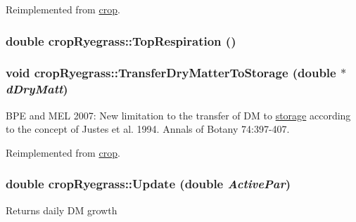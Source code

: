 Reimplemented from \hyperlink{classcrop_a8b5cf5b385f82405af121592f7106fc2}{crop}.\hypertarget{classcrop_ryegrass_a81ee410c4677a88854065d2cbcecf4fc}{
\subsubsection[{TopRespiration}]{\setlength{\rightskip}{0pt plus 5cm}double cropRyegrass::TopRespiration ()}}
\label{classcrop_ryegrass_a81ee410c4677a88854065d2cbcecf4fc}
\hypertarget{classcrop_ryegrass_a41ff7bdc52b0466a4598e104b4723572}{
\subsubsection[{TransferDryMatterToStorage}]{\setlength{\rightskip}{0pt plus 5cm}void cropRyegrass::TransferDryMatterToStorage (double $\ast$ {\em dDryMatt})}}
\label{classcrop_ryegrass_a41ff7bdc52b0466a4598e104b4723572}
BPE and MEL 2007: New limitation to the transfer of DM to \hyperlink{classstorage}{storage} according to the concept of Justes et al. 1994. Annals of Botany 74:397-\/407. 

Reimplemented from \hyperlink{classcrop_aa93103e69836afc4fb23c1a29b15584f}{crop}.\hypertarget{classcrop_ryegrass_a6785773151146d1e49ec5bb5c75636aa}{
\subsubsection[{Update}]{\setlength{\rightskip}{0pt plus 5cm}double cropRyegrass::Update (double {\em ActivePar})}}
\label{classcrop_ryegrass_a6785773151146d1e49ec5bb5c75636aa}
Returns daily DM growth 

